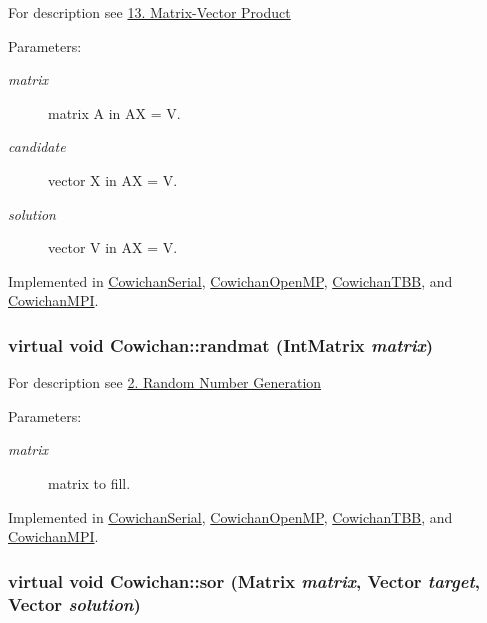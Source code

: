 For description see \hyperlink{index_product_sec}{13. Matrix-Vector Product} \begin{Desc}
\item[Parameters:]
\begin{description}
\item[{\em matrix}]matrix A in AX = V. \item[{\em candidate}]vector X in AX = V. \item[{\em solution}]vector V in AX = V. \end{description}
\end{Desc}


Implemented in \hyperlink{class_cowichan_serial_00411b35445d7d3038b96d53e43bdffa}{CowichanSerial}, \hyperlink{class_cowichan_open_m_p_41d0067382570d1e784f62f2c5963d49}{CowichanOpenMP}, \hyperlink{class_cowichan_t_b_b_f3144458520e2dff1f9fad5753f6fc3d}{CowichanTBB}, and \hyperlink{class_cowichan_m_p_i_1b7dccf774caccb26839cd29fe0a5cb0}{CowichanMPI}.\hypertarget{class_cowichan_c44cacf9d9e363a5b076bcee8b9a7a73}{
\subsubsection[{randmat}]{\setlength{\rightskip}{0pt plus 5cm}virtual void Cowichan::randmat ({\bf IntMatrix} {\em matrix})}}
\label{class_cowichan_c44cacf9d9e363a5b076bcee8b9a7a73}


For description see \hyperlink{index_randmat_sec}{2. Random Number Generation} \begin{Desc}
\item[Parameters:]
\begin{description}
\item[{\em matrix}]matrix to fill. \end{description}
\end{Desc}


Implemented in \hyperlink{class_cowichan_serial_2d24c0e562f7b109ec2ed916f38e5911}{CowichanSerial}, \hyperlink{class_cowichan_open_m_p_2c7c4e4dd96f82b7280a412c1fceed2c}{CowichanOpenMP}, \hyperlink{class_cowichan_t_b_b_b9b5cb4b4b5dc8907b2a01825cd4aaff}{CowichanTBB}, and \hyperlink{class_cowichan_m_p_i_6805f21144aeaeddc4549e1b2b42bca8}{CowichanMPI}.\hypertarget{class_cowichan_92d8d9ae77208115fdfe69e1174f601c}{
\subsubsection[{sor}]{\setlength{\rightskip}{0pt plus 5cm}virtual void Cowichan::sor ({\bf Matrix} {\em matrix}, \/  {\bf Vector} {\em target}, \/  {\bf Vector} {\em solution})}}
\label{class_cowichan_92d8d9ae77208115fdfe69e1174f601c}


